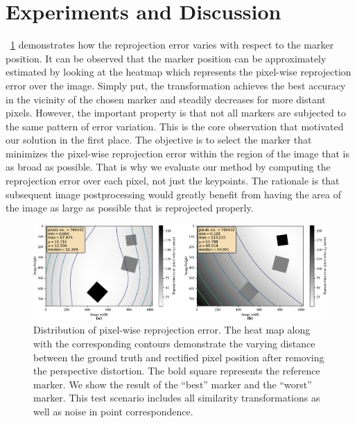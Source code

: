 \section{Experiments and Discussion}
\label{sec:HomographyExperiments}

\figtext{}~\ref{fig:HeatmapsBestWorst} demonstrates how the reprojection error varies with respect to the marker position. It can be observed that the marker position can be approximately estimated by looking at the heatmap which represents the pixel-wise reprojection error over the image. Simply put, the transformation achieves the best accuracy in the vicinity of the chosen marker and steadily decreases for more distant pixels. However, the important property is that not all markers are subjected to the same pattern of error variation. This is the core observation that motivated our solution in the first place. The objective is to select the marker that minimizes the pixel-wise reprojection error within the region of the image that is as broad as possible. That is why we evaluate our method by computing the reprojection error over each pixel, not just the keypoints. The rationale is that subsequent image postprocessing would greatly benefit from having the area of the image as large as possible that is reprojected properly.

\begin{figure}[t]
    \centerline{\includegraphics[width=\linewidth]{figures/homography/heatmaps_best_worst.pdf}}
    \caption[Homography ranking heatmaps]{Distribution of pixel-wise reprojection error. The heat map along with the corresponding contours demonstrate the varying distance between the ground truth and rectified pixel position after removing the perspective distortion. The bold square represents the reference marker. We show the result of  the ``best'' marker and  the ``worst'' marker. This test scenario includes all similarity transformations as well as noise in point correspondence.}
    \label{fig:HeatmapsBestWorst}
\end{figure}

